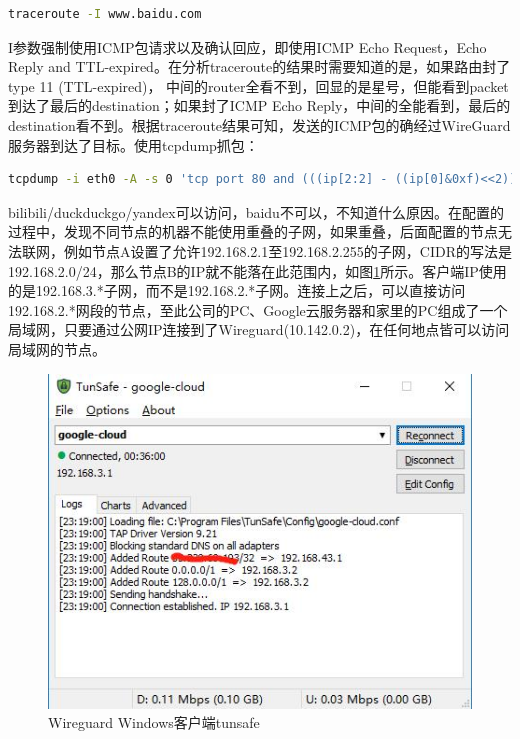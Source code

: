 \documentclass[8pt]{book}
\numberwithin{dummy}{section}
\theoremstyle{ocrenumbox}
\theoremstyle{blacknumex}
\theoremstyle{blacknumbox}
\theoremstyle{ocrenum}
\begin{document}
\begin{lstlisting}[language=Bash]
traceroute -I www.baidu.com
\end{lstlisting}

I参数强制使用ICMP包请求以及确认回应，即使用ICMP Echo Request，Echo Reply and TTL-expired。在分析traceroute的结果时需要知道的是，如果路由封了type 11 (TTL-expired)， 中间的router全看不到，回显的是星号，但能看到packet到达了最后的destination；如果封了ICMP Echo Reply，中间的全能看到，最后的destination看不到。根据traceroute结果可知，发送的ICMP包的确经过WireGuard服务器到达了目标。使用tcpdump抓包：

\begin{lstlisting}[language=Bash]
tcpdump -i eth0 -A -s 0 'tcp port 80 and (((ip[2:2] - ((ip[0]&0xf)<<2)) - ((tcp[12]&0xf0)>>2)) != 0)'|grep "bilibili"
\end{lstlisting}

bilibili/duckduckgo/yandex可以访问，baidu不可以，不知道什么原因。在配置的过程中，发现不同节点的机器不能使用重叠的子网，如果重叠，后面配置的节点无法联网，例如节点A设置了允许192.168.2.1至192.168.2.255的子网，CIDR的写法是192.168.2.0/24，那么节点B的IP就不能落在此范围内，如图\ref{fig:wireguardtunsafeclient}所示。客户端IP使用的是192.168.3.*子网，而不是192.168.2.*子网。连接上之后，可以直接访问192.168.2.*网段的节点，至此公司的PC、Google云服务器和家里的PC组成了一个局域网，只要通过公网IP连接到了Wireguard(10.142.0.2)，在任何地点皆可以访问局域网的节点。

\begin{figure}[htbp]
	\centering
	\includegraphics[scale=0.7]{wireguardtunsafeclient.jpg}
	\caption{Wireguard Windows客户端tunsafe}
	\label{fig:wireguardtunsafeclient}
\end{figure}
\end{document}
